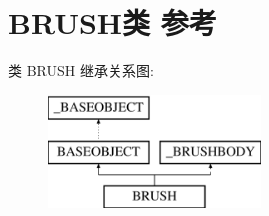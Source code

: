 \hypertarget{class_b_r_u_s_h}{}\section{B\+R\+U\+S\+H类 参考}
\label{class_b_r_u_s_h}
类 B\+R\+U\+SH 继承关系图\+:\begin{figure}[H]
\begin{center}
\leavevmode
\includegraphics[height=3.000000cm]{class_b_r_u_s_h}
\end{center}
\end{figure}
